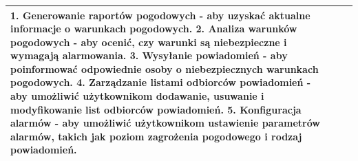 \documentclass{article}
\begin{document}
\begin{center}
\begin{center}
\begin{tabular}{|l|l|l|}
{        \newline
        \textbf{1.} Generowanie raportów pogodowych - aby uzyskać aktualne informacje o warunkach pogodowych.
        \newline
        \textbf{2.} Analiza warunków pogodowych - aby ocenić, czy warunki są niebezpieczne i wymagają alarmowania.
        \newline
        \textbf{3.} Wysyłanie powiadomień - aby poinformować odpowiednie osoby o niebezpiecznych warunkach pogodowych.
        \newline
        \textbf{4.} Zarządzanie listami odbiorców powiadomień - aby umożliwić użytkownikom dodawanie, usuwanie i modyfikowanie list odbiorców powiadomień.
        \newline
        \textbf{5.} Konfiguracja alarmów - aby umożliwić użytkownikom ustawienie parametrów alarmów, takich jak poziom zagrożenia pogodowego i rodzaj powiadomień.} \\
        \hline
        \end{tabular}
    \end{center}


\end{center}
\end{document}
